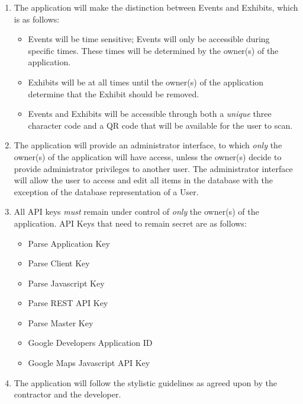 \documentclass{article}
\begin{document}
\begin{multicols}{2}
\begin{enumerate}
\item The application will make the distinction between Events and Exhibits, which is as follows:
\begin{itemize}
\item Events will be time sensitive; Events will only be accessible during specific times. These times will be determined by the owner(s) of the application.
\item Exhibits will be at all times until the owner(s) of the application determine that the Exhibit should be removed.
\item Events and Exhibits will be accessible through both a \textit{unique} three character code and a QR code that will be available for the user to scan.
\end{itemize}
\item The application will provide an administrator interface, to which \textit{only} the owner(s) of the application will have access, unless the owner(s) decide to provide administrator privileges to another user. The administrator interface will allow the user to access and edit all items in the database with the exception of the database representation of a User.
\item All API keys \textit{must} remain under control of \textit{only} the owner(s) of the application. API Keys that need to remain secret are as follows:
\begin{itemize}
\item Parse Application Key
\item Parse Client Key
\item Parse Javascript Key
\item Parse REST API Key
\item Parse Master Key
\item Google Developers Application ID
\item Google Maps Javascript API Key
\end{itemize}
\item The application will follow the stylistic guidelines as agreed upon by the contractor and the developer.
\end{enumerate}
\end{multicols}
\vspace{1cm}
\end{document}
